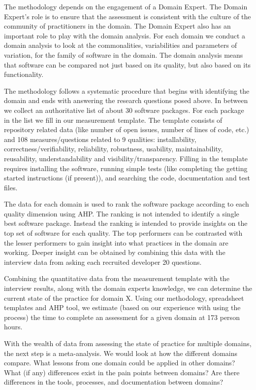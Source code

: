 \documentclass[runningheads]{llncs}
\begin{document}
The methodology depends on the engagement of a Domain Expert.  The Domain
Expert's role is to ensure that the assessment is consistent with the culture of
the community of practitioners in the domain.  The Domain Expert also has an
important role to play with the domain analysis.  For each domain we 
conduct a domain analysis to look at the commonalities, variabilities and
parameters of variation, for the family of software in the domain.  The domain
analysis means that software can be compared not just based on its quality, but
also based on its functionality.

The methodology follows a systematic procedure that begins with identifying the
domain and ends with answering the research questions posed above.  In between
we collect an authoritative list of about 30 software packages.  For each
package in the list we fill in our measurement template.  The template consists
of repository related data (like number of open issues, number of lines of code,
etc.) and 108 measures/questions related to 9 qualities: installability,
correctness/verifiability, reliability, robustness, usability, maintainability,
reusability, understandability and visibility/transparency. Filling in the
template requires installing the software, running simple tests (like completing
the getting started instructions (if present)), and searching the code,
documentation and test files.

The data for each domain is used to rank the software package according to each
quality dimension using AHP.  The ranking is not intended to identify a single
best software package.  Instead the ranking is intended to provide insights on
the top set of software for each quality.  The top performers can be contrasted
with the lesser performers to gain insight into what practices in the domain are
working.  Deeper insight can be obtained by combining this data with the
interview data from asking each recruited developer 20 questions.

Combining the quantitative data from the measurement template with the interview
results, along with the domain experts knowledge, we can determine the current
state of the practice for domain X.  Using our methodology, spreadsheet
templates and AHP tool, we estimate (based on our experience with using the
process) the time to complete an assessment for a given domain at 173 person
hours.

With the wealth of data from assessing the state of practice for multiple
domains, the next step is a meta-analysis.  We would look at how the different
domains compare. What lessons from one domain could be applied in other domains?
What (if any) differences exist in the pain points between domains?  Are there
differences in the tools, processes, and documentation between domains?
\end{document}
